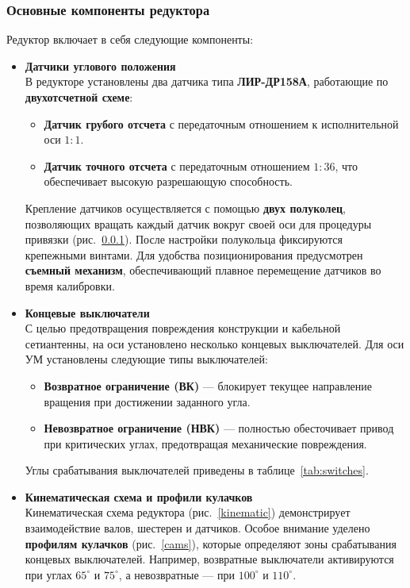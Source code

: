 \subsubsection{Основные компоненты редуктора}
Редуктор включает в себя следующие компоненты:
\begin{itemize}
    \item \textbf{Датчики углового положения} \\
    В редукторе установлены два датчика типа \textbf{ЛИР-ДР158А}, работающие по \textbf{двухотсчетной схеме}:
    \begin{itemize}
        \item \textbf{Датчик грубого отсчета} с передаточным отношением к исполнительной оси \(1:1\).
        \item \textbf{Датчик точного отсчета} с передаточным отношением \(1:36\), что обеспечивает высокую разрешающую способность.
    \end{itemize}
    Крепление датчиков осуществляется с помощью \textbf{двух полуколец}, позволяющих вращать каждый датчик вокруг своей оси для процедуры привязки (рис.~\ref{}). 
    После настройки полукольца фиксируются крепежными винтами. Для удобства позиционирования предусмотрен \textbf{съемный механизм}, 
    обеспечивающий плавное перемещение датчиков во время калибровки.

    \item \textbf{Концевые выключатели} \\
    С целью предотвращения повреждения конструкции и кабельной сетиантенны, на оси установлено несколько концевых выключателей. 
    Для оси УМ установлены следующие типы выключателей:
    \begin{itemize}
        \item \textbf{Возвратное ограничение (ВК)} — блокирует текущее направление вращения при достижении заданного угла.
        \item \textbf{Невозвратное ограничение (НВК)} — полностью обесточивает привод при критических углах, предотвращая механические повреждения.
    \end{itemize}
    Углы срабатывания выключателей приведены в таблице~\ref{tab:switches}.

    \item \textbf{Кинематическая схема и профили кулачков} \\
    Кинематическая схема редуктора (рис.~\ref{kinematic}) демонстрирует взаимодействие валов, шестерен и датчиков. Особое внимание уделено \textbf{профилям кулачков} (рис.~\ref{cams}), 
    которые определяют зоны срабатывания концевых выключателей. 
    Например, возвратные выключатели активируются при углах \(65^\circ\) и \(75^\circ\), а невозвратные — при \(100^\circ\) и \(110^\circ\).
\end{itemize}

